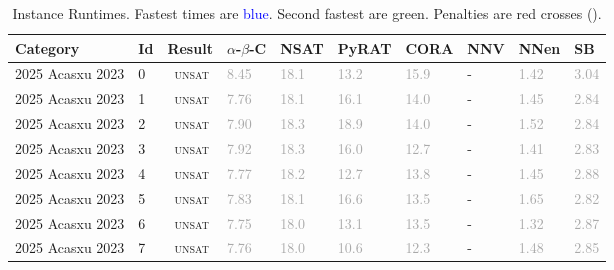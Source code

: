 

\begin{center}
{\setlength{\tabcolsep}{1pt}
\scriptsize
\begin{longtable}{@{}llllllllll@{}}
\caption{\footnotesize Instance Runtimes. Fastest times are \textcolor{blue}{blue}. Second fastest are \textcolor{second}{green}. Penalties are red crosses (\textbf{\textcolor{red}{}}).} \label{tab:all_results} \\
\toprule
\textbf{Category} & \textbf{Id} & \textbf{Result} & \textbf{$\alpha$-$\beta$-C} & \textbf{NSAT} & \textbf{PyRAT} & \textbf{CORA} & \textbf{NNV} & \textbf{NNen} & \textbf{SB} \\
\midrule
\endhead
2025 Acasxu 2023 & 0 & ~\textsc{unsat} & \textcolor{darkgray}{8.45} & \textcolor{darkgray}{18.1} & \textcolor{darkgray}{13.2} & \textcolor{darkgray}{15.9} & - & \textcolor{darkgray}{1.42} & \textcolor{darkgray}{3.04} \\
2025 Acasxu 2023 & 1 & ~\textsc{unsat} & \textcolor{darkgray}{7.76} & \textcolor{darkgray}{18.1} & \textcolor{darkgray}{16.1} & \textcolor{darkgray}{14.0} & - & \textcolor{darkgray}{1.45} & \textcolor{darkgray}{2.84} \\
2025 Acasxu 2023 & 2 & ~\textsc{unsat} & \textcolor{darkgray}{7.90} & \textcolor{darkgray}{18.3} & \textcolor{darkgray}{18.9} & \textcolor{darkgray}{14.0} & - & \textcolor{darkgray}{1.52} & \textcolor{darkgray}{2.84} \\
2025 Acasxu 2023 & 3 & ~\textsc{unsat} & \textcolor{darkgray}{7.92} & \textcolor{darkgray}{18.3} & \textcolor{darkgray}{16.0} & \textcolor{darkgray}{12.7} & - & \textcolor{darkgray}{1.41} & \textcolor{darkgray}{2.83} \\
2025 Acasxu 2023 & 4 & ~\textsc{unsat} & \textcolor{darkgray}{7.77} & \textcolor{darkgray}{18.2} & \textcolor{darkgray}{12.7} & \textcolor{darkgray}{13.8} & - & \textcolor{darkgray}{1.45} & \textcolor{darkgray}{2.88} \\
2025 Acasxu 2023 & 5 & ~\textsc{unsat} & \textcolor{darkgray}{7.83} & \textcolor{darkgray}{18.1} & \textcolor{darkgray}{16.6} & \textcolor{darkgray}{13.5} & - & \textcolor{darkgray}{1.65} & \textcolor{darkgray}{2.82} \\
2025 Acasxu 2023 & 6 & ~\textsc{unsat} & \textcolor{darkgray}{7.75} & \textcolor{darkgray}{18.0} & \textcolor{darkgray}{13.1} & \textcolor{darkgray}{13.5} & - & \textcolor{darkgray}{1.32} & \textcolor{darkgray}{2.87} \\
2025 Acasxu 2023 & 7 & ~\textsc{unsat} & \textcolor{darkgray}{7.76} & \textcolor{darkgray}{18.0} & \textcolor{darkgray}{10.6} & \textcolor{darkgray}{12.3} & - & \textcolor{darkgray}{1.48} & \textcolor{darkgray}{2.85} \\

\end{longtable}}
\end{center}
